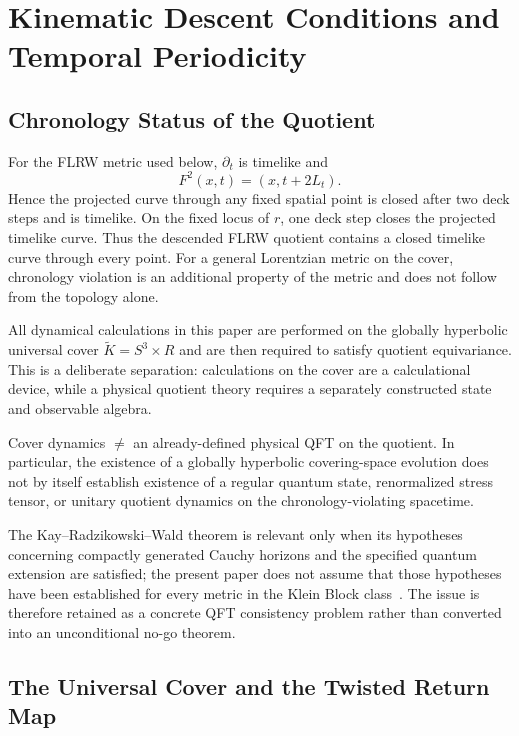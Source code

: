 \documentclass[11pt]{article}
\theoremstyle{canonmath}
\theoremstyle{canonpostulate}
\theoremstyle{canonclaim}
\providecommand{\Klein}{\mathcal{K}}
\providecommand{\R}{\mathbb{R}}
\providecommand{\Sthree}{S^3}
\def\mathbb#1{#1}%
\def\mathcal#1{#1}%
\begin{document}
\section{Kinematic Descent Conditions and Temporal Periodicity}
\label{sec:grav}

\subsection{Chronology Status of the Quotient}

For the FLRW metric used below, $\partial_t$ is timelike and
\begin{equation}
F^2(x,t)=(x,t+2L_t).
\end{equation}
Hence the projected curve through any fixed spatial point is closed after two deck steps and is timelike. On the fixed locus of $r$, one deck step closes the projected timelike curve. Thus the descended FLRW quotient contains a closed timelike curve through every point. For a general Lorentzian metric on the cover, chronology violation is an additional property of the metric and does not follow from the topology alone.

All dynamical calculations in this paper are performed on the globally hyperbolic universal cover $\widetilde{\Klein}=\Sthree\times\R$ and are then required to satisfy quotient equivariance. This is a deliberate separation: calculations on the cover are a calculational device, while a physical quotient theory requires a separately constructed state and observable algebra.

\begin{keyresult}
Cover dynamics $\neq$ an already-defined physical QFT on the quotient. In particular, the existence of a globally hyperbolic covering-space evolution does not by itself establish existence of a regular quantum state, renormalized stress tensor, or unitary quotient dynamics on the chronology-violating spacetime.
\end{keyresult}

The Kay--Radzikowski--Wald theorem is relevant only when its hypotheses concerning compactly generated Cauchy horizons and the specified quantum extension are satisfied; the present paper does not assume that those hypotheses have been established for every metric in the Klein Block class~\cite{KayRadzikowskiWald}. The issue is therefore retained as a concrete QFT consistency problem rather than converted into an unconditional no-go theorem.

\subsection{The Universal Cover and the Twisted Return Map}
\end{document}
